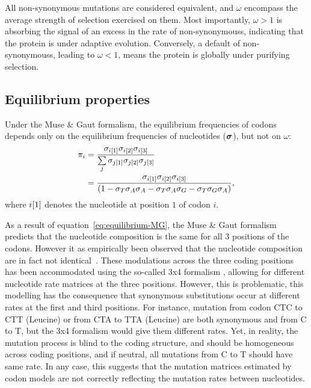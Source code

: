 All non-synonymous mutations are considered equivalent, and $\omega$ encompass the average strength of selection exercised on them.
Most importantly, $\omega>1$ is absorbing the signal of an excess in the rate of \glspl{non-synonymous}, indicating that the protein is under adaptive evolution.
Conversely, a default of \glspl{non-synonymous}, leading to $\omega<1$, means the protein is globally under purifying selection.

\subsection{Equilibrium properties}
\label{subsec:equilibrium-properties}

Under the Muse \& Gaut formalism, the equilibrium frequencies of \glspl{codon} depends only on the equilibrium frequencies of nucleotides ($\bm{\sigma}$), but not on $\omega$:
\begin{align}
    \pi_{{i}} & = \dfrac{\sigma_{{i}[1]}\sigma_{{i}[2]}\sigma_{{i}[3]}}{\sum\limits_{{j}}\sigma_{{j}[1]}\sigma_{{j}[2]}\sigma_{{j}[3]} } \\
    & = \dfrac{\sigma_{{i}[1]}\sigma_{{i}[2]}\sigma_{{i}[3]}}{(1 - \sigma_{T}\sigma_{A}\sigma_{A} - \sigma_{T}\sigma_{A}\sigma_{G} - \sigma_{T}\sigma_{G}\sigma_{A} )}, \label{eq:equilibrium-MG}
\end{align}
where ${i}[1]$ denotes the nucleotide at position $1$ of \gls{codon} $i$.

As a result of equation~\ref{eq:equilibrium-MG}, the Muse \& Gaut formalism predicts that the nucleotide composition is the same for all $3$ positions of the codons.
However it as empirically been observed that the nucleotide composition are in fact not identical~\citep{Singer2000}.
These modulations across the three coding positions has been accommodated using the so-called 3x4 formalism , allowing for different nucleotide rate matrices at the three positions.
However, this is problematic, this modelling has the consequence that synonymous substitutions occur at different rates at the first and third positions.
For instance, mutation from codon CTC to CTT (Leucine) or from CTA to TTA (Leucine) are both synonymous and from C to T, but the 3x4 formalism would give them different rates.
Yet, in reality, the mutation process is blind to the coding structure, and should be homogeneous across coding positions, and if neutral, all mutations from C to T should have same rate.
In any case, this suggests that the mutation matrices estimated by codon models are not correctly reflecting the mutation rates between nucleotides.

